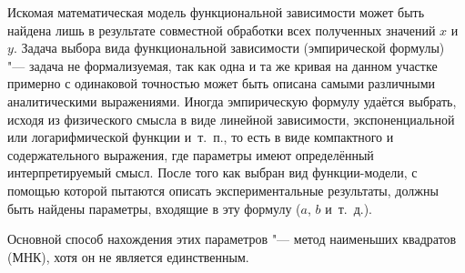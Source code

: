 \documentclass[a4paper, 12pt]{extarticle}
\begin{document}
Искомая математическая модель функциональной зависимости может быть найдена лишь в результате совместной обработки всех полученных значений $x$ и $y$. Задача выбора вида функциональной зависимости (эмпирической формулы) "--- задача не формализуемая, так как одна и та же кривая на данном участке примерно с одинаковой точностью может быть описана самыми различными аналитическими выражениями. %
Иногда эмпирическую формулу удаётся выбрать, исходя из физического смысла в виде линейной зависимости, экспоненциальной или логарифмической функции и~т.~п., то есть в виде компактного и содержательного выражения, где параметры имеют определённый интерпретируемый смысл. После того как выбран вид функции-модели, с помощью которой пытаются описать экспериментальные результаты, должны быть найдены параметры, входящие в эту формулу ($a$, $b$ и~т.~д.). %

Основной способ нахождения этих параметров "--- метод наименьших квадратов (МНК), хотя он не является единственным.
\end{document}
